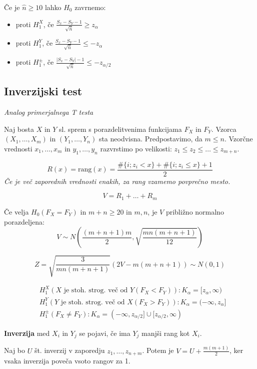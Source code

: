 \begin{multicols}{5}
Če je $\hat{n} \geq 10$ lahko $H_0$ zavrnemo:
\begin{itemize}
    \item proti $H_1^X$, če $\frac{S_x - S_Y - 1}{\sqrt{\hat{n}}} \geq z_\alpha$
    \item proti $H_1^Y$, če $\frac{S_x - S_Y - 1}{\sqrt{\hat{n}}} \leq -z_\alpha$
    \item proti $H_1^\pm$, če $\frac{|S_x - S_Y| - 1}{\sqrt{\hat{n}}} \leq -z_{\alpha/2}$
\end{itemize}

\subsection{Inverzijski test}
\textit{Analog primerjalnega T testa}

Naj bosta $X$ in $Y$ sl. sprem s porazdelitvenima funkcijama $F_X$ in $F_Y$. Vzorca $(X_1, \dots, X_m)$ in $(Y_1, \dots, Y_n)$ sta neodvisna. Predpostavimo, da $m \leq n$.
Vzorčne vrednosti $x_1, \dots, x_m$ in $y_1, \dots, y_n$ razvrstimo po velikosti: $z_1 \leq z_2 \leq \dots \leq z_{m+n}$.

\[ R(x) = \text{rang}(x) = \frac{\#\{i; z_i < x\} + \#\{i; z_i \leq x\} + 1}{2}\]
\textit{Če je več zaporednih vrednosti enakih, za rang vzamemo povprečno mesto.}

\[ V = R_1 + \dots + R_m \]

Če velja $H_0(F_X = F_Y)$ in $m+n \geq 20$ in $m,n$, je $V$ približno normalno porazdeljena:
\[ V \sim N\left( \frac{(m+n+1)m}{2}, \sqrt{\frac{mn(m+n+1)}{12}} \right)\]

\[ Z = \sqrt{\frac{3}{mn(m+n+1)}} (2V - m(m+n+1)) \sim N(0,1) \]

\begin{align*}
    &H_1^X(X \text{ je stoh. strog. več od } Y (F_X < F_Y)): K_\alpha = [z_\alpha, \infty) \\
    &H_1^Y(Y \text{ je stoh. strog. več od } X (F_X > F_Y)): K_\alpha = (-\infty, z_\alpha] \\
    &H_1^\pm(F_X \neq F_Y): K_\alpha = (-\infty, z_{\alpha/2}] \cup [z_{\alpha/2}, \infty)
\end{align*}

\textbf{Inverzija} med $X_i$ in $Y_j$ se pojavi, če ima $Y_j$ manjši rang kot $X_i$.

Naj bo $U$ št. inverzij v zaporedju $z_1, \dots, z_{n+m}$. Potem je $V = U + \frac{m(m+1)}{2}$, ker vsaka inverzija poveča vsoto rangov za 1.

\end{multicols}
